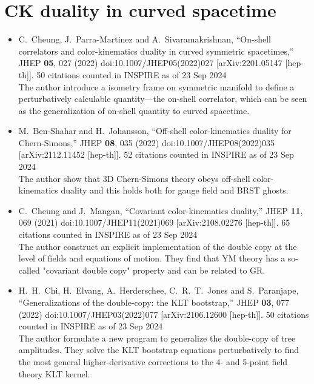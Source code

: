 \documentclass[a4paper,12pt]{article}
\begin{document}
\section*{CK duality in curved spacetime}
\begin{itemize}
    \item %
    C.~Cheung, J.~Parra-Martinez and A.~Sivaramakrishnan,
    ``On-shell correlators and color-kinematics duality in curved symmetric spacetimes,''
    JHEP \textbf{05}, 027 (2022)
    doi:10.1007/JHEP05(2022)027
    [arXiv:2201.05147 [hep-th]].
    50 citations counted in INSPIRE as of 23 Sep 2024\\
    The author introduce a isometry frame on symmetric manifold to define a perturbatively calculable quantity—the on-shell correlator, which can be seen as 
    the generalization of on-shell quantity to curved spacetime.
    \item %
    M.~Ben-Shahar and H.~Johansson,
    ``Off-shell color-kinematics duality for Chern-Simons,''
    JHEP \textbf{08}, 035 (2022)
    doi:10.1007/JHEP08(2022)035
    [arXiv:2112.11452 [hep-th]].
    52 citations counted in INSPIRE as of 23 Sep 2024\\
    The author show that 3D Chern-Simons theory obeys off-shell color-kinematics duality and this holds both for gauge field and BRST ghosts.
    \item %
    C.~Cheung and J.~Mangan,
    ``Covariant color-kinematics duality,''
    JHEP \textbf{11}, 069 (2021)
    doi:10.1007/JHEP11(2021)069
    [arXiv:2108.02276 [hep-th]].
    65 citations counted in INSPIRE as of 23 Sep 2024\\
    The author construct an
    explicit implementation of the double copy at the level of fields and equations of motion. They find that YM theory has a so-called "covariant 
    double copy" property and can be related to GR.
    \item %
    H.~H.~Chi, H.~Elvang, A.~Herderschee, C.~R.~T.~Jones and S.~Paranjape,
    ``Generalizations of the double-copy: the KLT bootstrap,''
    JHEP \textbf{03}, 077 (2022)
    doi:10.1007/JHEP03(2022)077
    [arXiv:2106.12600 [hep-th]].
    50 citations counted in INSPIRE as of 23 Sep 2024\\
    The author formulate a new program to generalize the double-copy of tree amplitudes. They solve the KLT bootstrap equations perturbatively to find the most general higher-derivative
    corrections to the 4- and 5-point field theory KLT kernel.

\end{itemize}
\end{document}
